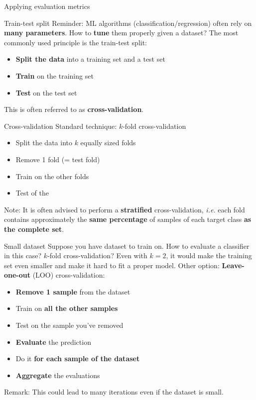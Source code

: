 \documentclass{beamer}
\begin{document}
\begin{frame}
\begin{center}
\Huge{Applying evaluation metrics}
\end{center}
\end{frame}

\begin{frame}{Train-test split}
Reminder: ML algorithms (classification/regression) often rely on \textbf{many parameters}. How to \textbf{tune} them properly given a dataset?
\vfill
\pause
The most commonly used principle is the train-test split:
\begin{itemize}
	\item \textbf{Split the data} into a training set and a test set
	\item \textbf{Train} on the training set
	\item \textbf{Test} on the test set
\end{itemize}
\vfill
\pause
This is often referred to as \textbf{cross-validation}.
\end{frame}

\begin{frame}{Cross-validation}
Standard technique: $k$-fold cross-validation
\begin{itemize}
	\item Split the data into $k$ equally sized folds
	\item Remove 1 fold (= test fold)
	\item Train on the other folds
	\item Test of the 
\end{itemize}
\vfill
\pause
Note: It is often advised to perform a \textbf{stratified} cross-validation, \textit{i.e.} each fold contains approximately the \textbf{same percentage} of samples of each target class \textbf{as the complete set}.
\end{frame}

\begin{frame}{Small dataset}
Suppose you have dataset to train on. How to evaluate a classifier in this case?
\vfill
\pause
$k$-fold cross-validation? Even with $k = 2$, it would make the training set even smaller and make it hard to fit a proper model.
\vfill
\pause
Other option: \textbf{Leave-one-out} (LOO) cross-validation:
\pause
\begin{itemize}
	\item \textbf{Remove 1 sample} from the dataset
	\item Train on \textbf{all the other samples}
	\item Test on the sample you've removed
	\item \textbf{Evaluate} the prediction
	\item Do it \textbf{for each sample of the dataset}
	\item \textbf{Aggregate} the evaluations
\end{itemize}
\pause
\vfill
Remark: This could lead to many iterations even if the dataset is small.
\end{frame}
\end{document}
